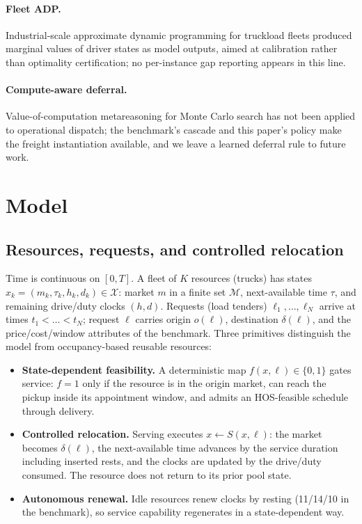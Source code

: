 \documentclass[11pt]{article}
\begin{document}
\paragraph{Fleet ADP.} Industrial-scale approximate dynamic programming
for truckload fleets \citep{simao2009adp,powell2007stochastic} produced
marginal values of driver states as model outputs, aimed at calibration
rather than optimality certification; no per-instance gap reporting
appears in this line.

\paragraph{Compute-aware deferral.} Value-of-computation metareasoning
for Monte Carlo search \citep{sezener2020voc} has not been applied to
operational dispatch; the benchmark's cascade and this paper's policy
make the freight instantiation available, and we leave a learned
deferral rule to future work.

\section{Model}
\label{sec:model}

\subsection{Resources, requests, and controlled relocation}

Time is continuous on $[0, T]$. A fleet of $K$ resources (trucks) has
states $x_k = (m_k, \tau_k, h_k, d_k) \in \mathcal{X}$: market $m$ in a
finite set $\mathcal{M}$, next-available time $\tau$, and remaining
drive/duty clocks $(h, d)$. Requests (load tenders)
$\ell_1, \dots, \ell_N$ arrive at times $t_1 < \dots < t_N$; request
$\ell$ carries origin $o(\ell)$, destination $\delta(\ell)$, and the
price/cost/window attributes of the benchmark. Three primitives
distinguish the model from occupancy-based reusable resources:

\begin{itemize}
\item \textbf{State-dependent feasibility.} A deterministic map
  $f(x, \ell) \in \{0, 1\}$ gates service: $f = 1$ only if the resource
  is in the origin market, can reach the pickup inside its appointment
  window, and admits an HOS-feasible schedule through delivery.
\item \textbf{Controlled relocation.} Serving executes
  $x \leftarrow S(x, \ell)$: the market becomes $\delta(\ell)$, the
  next-available time advances by the service duration including
  inserted rests, and the clocks are updated by the drive/duty consumed.
  The resource does not return to its prior pool state.
\item \textbf{Autonomous renewal.} Idle resources renew clocks by
  resting (11/14/10 in the benchmark), so service capability regenerates
  in a state-dependent way.
\end{itemize}
\end{document}
